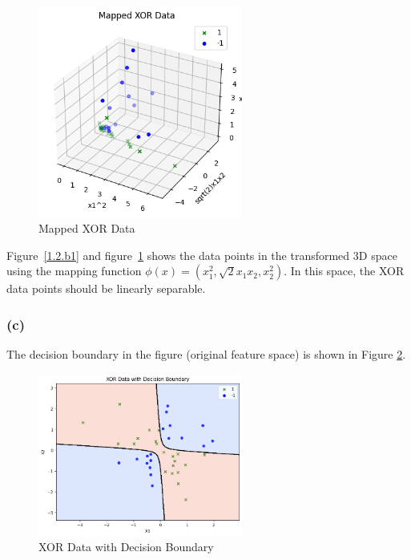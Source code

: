 \documentclass[oneside,solution]{seu-ml-assign}
\begin{document}
\begin{figure}[htbp]
  \centering
  \includegraphics[width=0.6\textwidth]{1.2.b2.png}
  \caption[Mapped XOR Data]{Mapped XOR Data}
  \label{1.2.b2}
\end{figure}
Figure~\ref{1.2.b1} and figure~\ref{1.2.b2} shows the data points in the transformed 3D space using the mapping function $\phi(x)=(x_1^2,\sqrt{2}x_1x_2,x_2^2)$.
In this space, the XOR data points should be linearly separable.



\subsubsection{(c)}


The decision boundary in the figure (original feature space) is shown in Figure \ref{1.2.c1}.
\begin{figure}[htbp]
  \centering
  \includegraphics[width=0.6\textwidth]{1.2.c1.png}
  \caption[XOR Data with Decision Boundary]{XOR Data with Decision Boundary}
  \label{1.2.c1}
\end{figure}
\end{document}
